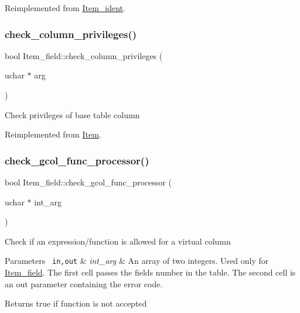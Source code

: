 Reimplemented from \mbox{\hyperlink{classItem__ident_a0df960611ccdb8822900a5749b61d889}{Item\+\_\+ident}}.

\mbox{\label{classItem__field_a221c5bbedbd2f9a64c1e60863401fb09}} 
\subsubsection{\texorpdfstring{check\+\_\+column\+\_\+privileges()}{check\_column\_privileges()}}
{\footnotesize\ttfamily bool Item\+\_\+field\+::check\+\_\+column\+\_\+privileges (\begin{DoxyParamCaption}\item[{uchar $\ast$}]{arg }\end{DoxyParamCaption})\hspace{0.3cm}{\ttfamily [virtual]}}

Check privileges of base table column 

Reimplemented from \mbox{\hyperlink{classItem}{Item}}.

\mbox{\label{classItem__field_a9a5288fcbc34ac4bda07a8e11c86269c}} 
\subsubsection{\texorpdfstring{check\+\_\+gcol\+\_\+func\+\_\+processor()}{check\_gcol\_func\_processor()}}
{\footnotesize\ttfamily bool Item\+\_\+field\+::check\+\_\+gcol\+\_\+func\+\_\+processor (\begin{DoxyParamCaption}\item[{uchar $\ast$}]{int\+\_\+arg }\end{DoxyParamCaption})\hspace{0.3cm}{\ttfamily [virtual]}}

Check if an expression/function is allowed for a virtual column


\begin{DoxyParams}[1]{Parameters}
\mbox{\texttt{ in,out}}  & {\em int\+\_\+arg} & An array of two integers. Used only for \mbox{\hyperlink{classItem__field}{Item\+\_\+field}}. The first cell passes the field\textquotesingle{}s number in the table. The second cell is an out parameter containing the error code.\\
\hline
\end{DoxyParams}
\begin{DoxyReturn}{Returns}
true if function is not accepted 
\end{DoxyReturn}


